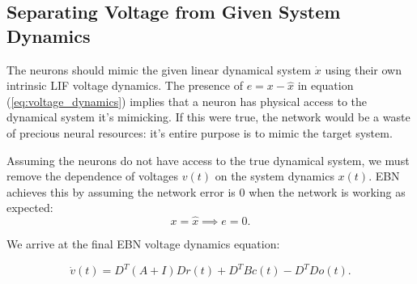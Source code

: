 \documentclass{article}
\begin{document}
\subsection{Separating Voltage from Given System Dynamics} 
The neurons should mimic the given linear dynamical system $\dot{x}$ using their own intrinsic LIF voltage dynamics. The presence of $e = x - \hat{x}$ in equation (\ref{eq:voltage_dynamics}) implies that a neuron has physical access to the dynamical system it's mimicking. If this were true, the network would be a waste of precious neural resources: it's entire purpose is to mimic the target system. 

Assuming the neurons do not have access to the true dynamical system, we must remove the dependence of voltages $v(t)$ on the system dynamics $x(t)$.  EBN achieves this by assuming the network error is $0$ when the network is working as expected:
$$
x = \hat{x} \implies e = 0. 
$$

We arrive at the final EBN voltage dynamics equation:

\begin{equation}
\label{eq:voltage_dynamics_final}
\dot{v}(t) = D^T(A + I)Dr(t) + D^TBc(t) - D^TDo(t).
\end{equation}
\end{document}

